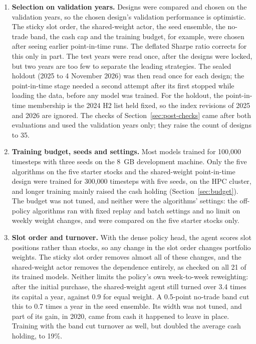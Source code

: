 \begin{enumerate}
  \item \textbf{Selection on validation years.} Designs were compared and chosen on the validation years, so the chosen design's validation performance is optimistic. The sticky slot order, the shared-weight actor, the seed ensemble, the no-trade band, the cash cap and the training budget, for example, were chosen after seeing earlier point-in-time runs. The deflated Sharpe ratio corrects for this only in part. The test years were read once, after the designs were locked, but two years are too few to separate the leading strategies. The sealed holdout (2025 to 4 November 2026) was then read once for each design; the point-in-time stage needed a second attempt after its first stopped while loading the data, before any model was trained. For the holdout, the point-in-time membership is the 2024 H2 list held fixed, so the index revisions of 2025 and 2026 are ignored. The checks of Section~\ref{sec:post-checks} came after both evaluations and used the validation years only; they raise the count of designs to 35.
  \item \textbf{Training budget, seeds and settings.} Most models trained for 100{,}000 timesteps with three seeds on the 8~GB development machine. Only the five algorithms on the five starter stocks and the shared-weight point-in-time design were trained for 300{,}000 timesteps with five seeds, on the HPC cluster, and longer training mainly raised the cash holding (Section~\ref{sec:budget}). The budget was not tuned, and neither were the algorithms' settings: the off-policy algorithms ran with fixed replay and batch settings and no limit on weekly weight changes, and were compared on the five starter stocks only.
  \item \textbf{Slot order and turnover.} With the dense policy head, the agent scores slot positions rather than stocks, so any change in the slot order changes portfolio weights. The sticky slot order removes almost all of these changes, and the shared-weight actor removes the dependence entirely, as checked on all 21 of its trained models. Neither limits the policy's own week-to-week reweighting: after the initial purchase, the shared-weight agent still turned over 3.4 times its capital a year, against 0.9 for equal weight. A 0.5-point no-trade band cut this to 0.7 times a year in the seed ensemble. Its width was not tuned, and part of its gain, in 2020, came from cash it happened to leave in place. Training with the band cut turnover as well, but doubled the average cash holding, to 19\%.
\end{enumerate}

